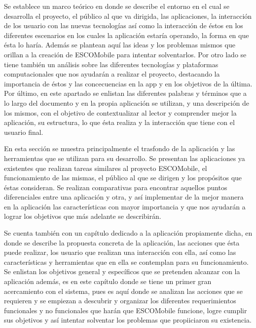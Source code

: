 \noindent
Se establece un marco teórico en donde se describe el entorno en el cual se desarrolla el proyecto, el público al que va dirigida, las aplicaciones, la interacción de los usuario con las nuevas tecnologías así como la interacción de éstos en los diferentes escenarios en los cuales la aplicación estaría operando, la forma en que ésta lo haría. Además se plantean aquí las ideas y los problemas mismos que orillan a la creación de ESCOMobile para intentar solventarlos. Por otro lado se tiene también un análisis sobre las diferentes tecnologías y plataformas computacionales que nos ayudarán a realizar el proyecto, destacando la importancia de éstos y las concecuencias en la app y en los objetivos de la última. Por último, en este apartado se enlistan las diferentes palabras y términos que a lo largo del documento y en la propia aplicación se utilizan, y una descripción de los mismos, con el objetivo de contextualizar al lector y comprender mejor la aplicación, su estructura, lo que ésta realiza y la interacción que tiene con el usuario final.

\noindent
En esta sección se muestra principalmente el trasfondo de la aplicación y las herramientas que se utilizan para su desarrollo. Se presentan las aplicaciones ya existentes que realizan tareas similares al proyecto ESCOMobile, el funcionamiento de las mismas, el público al que se dirigen y los propósitos que éstas consideran. Se realizan comparativas para encontrar aquellos puntos diferenciales entre una aplicación y otra, y así implementar de la mejor manera en la aplicación las características con mayor importancia y que nos ayudarán a lograr los objetivos que más adelante se describirán. 

\noindent
Se cuenta también con un capítulo dedicado a la aplicación propiamente dicha, en donde se describe la propuesta concreta de la aplicación, las acciones que ésta puede realizar, los usuario que realizan una interacción con ella, así como las características y herramientas que en ella se contemplan para su funcionamiento. Se enlistan los objetivos general y específicos que se pretenden alcanzar con la aplicación además, es en este capítulo donde se tiene un primer gran acercamiento con el sistema, pues es aquí donde se analizan las acciones que se requieren y se empiezan a descubrir y organizar los diferentes requerimientos funcionales y no funcionales que harán que ESCOMobile funcione, logre cumplir sus objetivos y así intentar solventar los problemas que propiiciaron su existencia. 

